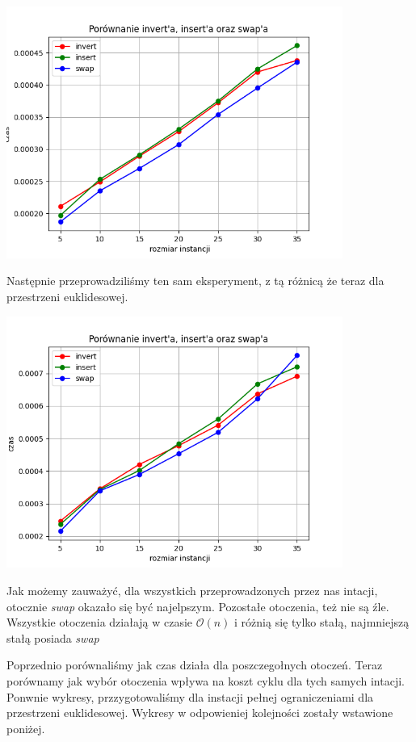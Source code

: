 \documentclass{article}
\begin{document}
    \includegraphics[width=11cm]{./spr2img/Figure_1.png}

    Następnie przeprowadziliśmy ten sam eksperyment, z tą różnicą
    że teraz dla przestrzeni euklidesowej.

    \includegraphics[width=11cm]{./spr2img/Figure_1_EUC2D.png}

    Jak możemy zauważyć, dla wszystkich przeprowadzonych
    przez nas intacji, otocznie \emph{swap} okazało się być
    najelpszym. Pozostałe otoczenia, też nie są źle. Wszystkie
    otoczenia działają w czasie $\mathcal{O}(n)$ i różnią się tylko
    stałą, najmniejszą stałą posiada \emph{swap}

    Poprzednio porównaliśmy jak czas działa dla poszczegołnych otoczeń. Teraz 
    porównamy jak wybór otoczenia wpływa na koszt cyklu dla tych samych 
    intacji. Ponwnie wykresy, przzygotowaliśmy dla instacji pełnej ograniczeniami
    dla przestrzeni euklidesowej. Wykresy w odpowieniej kolejności zostały
    wstawione poniżej.
\end{document}
